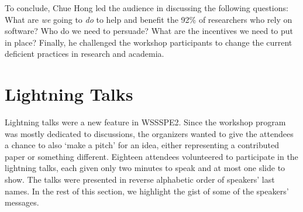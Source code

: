 \documentclass[11pt, oneside]{amsart}
\newcommand{\note}[1]{ {\textcolor{blueish}    { ***Note:      #1 }}}
\begin{document}
To conclude, Chue Hong led the audience in discussing the following questions: 
What are \emph{we} going to \emph{do} to help and benefit the 92\% of researchers 
who rely on software? Who do we need to persuade? What are the incentives we 
need to put in place? Finally, he challenged the workshop participants to change 
the current deficient practices in research and academia.


\section{Lightning Talks} \label{sec:lightning}
\begin{comment}
\note{Lead: Choi. Volunteers welcome.
\href{http://wssspe.researchcomputing.org.uk/wssspe2/lightning-talks/}{Slides.}}
\end{comment}
 
\begin{comment}
Lighting talks, breakout groups, working groups are all different. Lightning
talks were new in WSSSPE2. They were offered to all paper contributors, and some
other attendees, those who got travel awards. Breakout groups in WSSSPE1 were
just discussions about topics; in WSSSPE2, the breakout groups were supposed to
come up with plans for actions in specific areas. The idea of working groups is
that they will come out of breakout groups as a way for the groups to actually
do the actions over time, not at the workshops.
 
Email addresses of speakers:
gvwilson@software-carpentry.org, Colin Venters <C.Venters@hud.ac.uk>,
j.spencer@imperial.ac.uk, erinrobinson@esipfed.org, marpierc@iu.edu,
jwpeterson@gmail.com, abani@buffalo.edu, clenhardt@renci.org, dsk@uchicago.edu,
Samin.Ishtiaq@microsoft.com, james@howison.name, s.a.harris@leeds.ac.uk,
marcus.hanwell@kitware.com, thabermann@hdfgroup.org, rdowns@ciesin.columbia.edu,
cboettig@gmail.com, jakob.blomer@cern.ch, editor@ascl.net 
\end{comment}  
  
Lightning talks were a new feature in WSSSPE2. Since the workshop program was
mostly dedicated to discussions, the organizers wanted to give the attendees a
chance to also `make a pitch' for an idea, either representing a contributed paper
or something different.  Eighteen attendees volunteered to participate in the lightning
talks, each given only two minutes to speak and at most one slide to show.
The talks were presented in reverse alphabetic order of speakers' last names. 
In the rest of this section, we highlight the gist of some of the speakers' messages.
\end{document}
